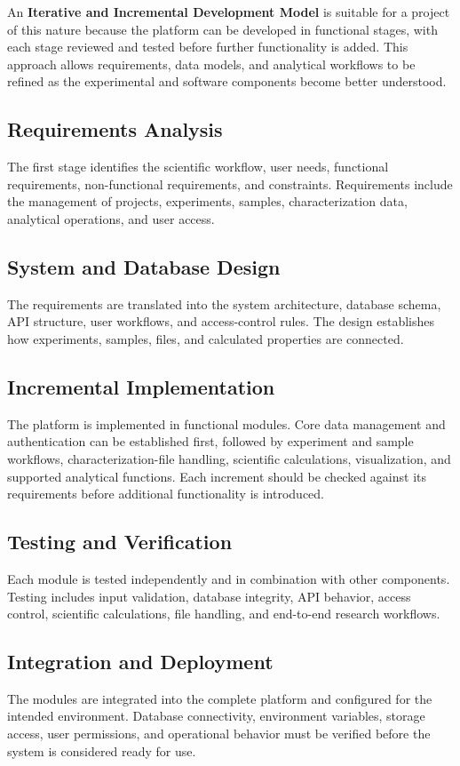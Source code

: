 \documentclass[12pt,a4paper,oneside]{report}
\begin{document}
{{{An \textbf{Iterative and Incremental Development Model} is suitable for a project of this nature because the platform can be developed in functional stages, with each stage reviewed and tested before further functionality is added. This approach allows requirements, data models, and analytical workflows to be refined as the experimental and software components become better understood.

\subsection{Requirements Analysis}
The first stage identifies the scientific workflow, user needs, functional requirements, non-functional requirements, and constraints. Requirements include the management of projects, experiments, samples, characterization data, analytical operations, and user access.

\subsection{System and Database Design}
The requirements are translated into the system architecture, database schema, API structure, user workflows, and access-control rules. The design establishes how experiments, samples, files, and calculated properties are connected.

\subsection{Incremental Implementation}
The platform is implemented in functional modules. Core data management and authentication can be established first, followed by experiment and sample workflows, characterization-file handling, scientific calculations, visualization, and supported analytical functions. Each increment should be checked against its requirements before additional functionality is introduced.

\subsection{Testing and Verification}
Each module is tested independently and in combination with other components. Testing includes input validation, database integrity, API behavior, access control, scientific calculations, file handling, and end-to-end research workflows.

\subsection{Integration and Deployment}
The modules are integrated into the complete platform and configured for the intended environment. Database connectivity, environment variables, storage access, user permissions, and operational behavior must be verified before the system is considered ready for use.

}}}
\end{document}
